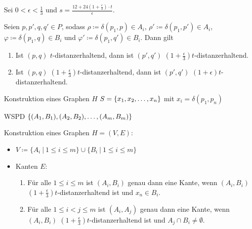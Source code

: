 \documentclass{beamer}
\begin{document}
	\begin{frame}
		Sei $0 < \epsilon < \frac{1}{3} $ und $s = \frac{12 + 24(1 + \frac{\epsilon}{3})\cdot t}{\epsilon}$.
		
		\begin{lemma}
	    	Seien $p, p', q, q' \in P$, sodass $\rho \coloneqq \delta(p_1, p) \in A_i$, $\rho' \coloneqq \delta(p_1, p') \in A_i$, $\varphi \coloneqq \delta(p_1, q) \in B_i$ und $\varphi' \coloneqq \delta(p_1, q') \in B_i$. Dann gilt
	    	\begin{enumerate}
	    		\item Ist $(p, q)$ $t$-distanzerhaltend, dann ist $(p', q')$ $(1 + \frac{\epsilon}{3})t$-distanzerhaltend.
	    		\item Ist $(p, q)$ $(1 + \frac{\epsilon}{3})t$-distanzerhaltend, dann ist $(p', q')$ $(1 + \epsilon)t$-distanzerhaltend.
	    	\end{enumerate}
		\end{lemma}
		\begin{figure}
			\def \svgwidth{\textwidth}
		\end{figure}
	\end{frame}
	
	\begin{frame}[t]{Konstruktion eines Graphen $H$}
		$S = \{x_1, x_2, \mathellipsis, x_n\}$ mit $x_i = \delta(p_1, p_n)$
		
		WSPD $\{(A_1, B_1), (A_2, B_2), \mathellipsis, (A_m, B_m)\}$
		
		\vspace{10px}
		Konstruktion eines Graphen $H = (V, E)$:
		\begin{itemize}
			\item $V \coloneqq \{A_i\ |\ 1 \leq i \leq m\} \cup \{B_i\ |\ 1\leq i \leq m\}$
			\item Kanten $E$:
			\begin{enumerate}
				\item Für alle $1 \leq i \leq m$ ist $(A_i, B_i)$ genau dann eine Kante, wenn $(A_i, B_i)$ $(1 + \frac{\epsilon}{3})t$-distanzerhaltend ist und $x_n \in B_i$.
				\item Für alle $1\leq i < j \leq m$ ist $(A_i, A_j)$ genau dann eine Kante, wenn $(A_i, B_i)$ $(1 + \frac{\epsilon}{3})t$-distanzerhaltend ist und $A_j \cap B_i \neq \emptyset$.
			\end{enumerate}
		\end{itemize}
	\end{frame}
	
\end{document}
